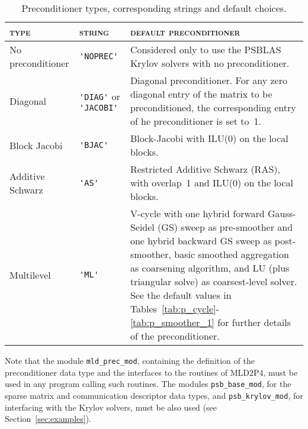 \begin{table}[h!]
\begin{center}
\begin{tabular}{|l|p{1.8cm}|p{8.2cm}|}
\hline
\textsc{type}       & \textsc{string} & \textsc{default preconditioner} \\ \hline
No preconditioner &\verb|'NOPREC'|& Considered only to use the PSBLAS
                                    Krylov solvers with no preconditioner. \\ \hline
Diagonal          & \verb|'DIAG'| or \verb|'JACOBI'| & Diagonal preconditioner.
                         For any zero diagonal entry of the matrix to be preconditioned,
                         the corresponding entry of he preconditioner is set to~1.\\ \hline
Block Jacobi      & \verb|'BJAC'| & Block-Jacobi with ILU(0) on the local blocks.\\ \hline
Additive Schwarz  & \verb|'AS'|   & Restricted Additive Schwarz (RAS),
                                    with overlap~1 and ILU(0) on the local blocks. \\ \hline
Multilevel        &\verb|'ML'|    & V-cycle with one hybrid forward Gauss-Seidel
                                    (GS) sweep as pre-smoother and one hybrid backward 
                                    GS sweep as post-smoother, basic smoothed aggregation
                                   as coarsening algorithm, and LU (plus triangular solve)
                                   as coarsest-level solver. See the default values in
                                   Tables~\ref{tab:p_cycle}-\ref{tab:p_smoother_1}
                                   for further details of the preconditioner. \\
\hline
\end{tabular}
\caption{Preconditioner types, corresponding strings and default choices.
\label{tab:precinit}}
\end{center}
\end{table}

Note that the module \verb|mld_prec_mod|, containing the definition of the 
preconditioner data type and the interfaces to the routines of MLD2P4,
must be used in any program calling such routines.
The modules \verb|psb_base_mod|, for the sparse matrix and communication descriptor
data types, and \verb|psb_krylov_mod|, for interfacing with the
Krylov solvers, must be also used (see Section~\ref{sec:examples}). \\

